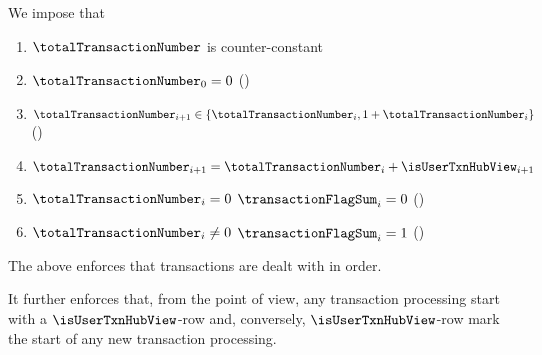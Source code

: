 We impose that
\begin{enumerate}
	\item $\totalTransactionNumber$ is counter-constant
	\item $\totalTransactionNumber _{0} = 0$ (\sanityCheck)
	\item $\totalTransactionNumber _{i + 1} \in \{ \totalTransactionNumber _{i}, 1 + \totalTransactionNumber _{i} \}$ (\sanityCheck)
	\item $\totalTransactionNumber _{i + 1} = \totalTransactionNumber _{i} + \isUserTxnHubView _{i + 1}$
	\item \If $\totalTransactionNumber _{i} =    0$ \Then $\transactionFlagSum _{i} = 0$ (\sanityCheck)
	\item \If $\totalTransactionNumber _{i} \neq 0$ \Then $\transactionFlagSum _{i} = 1$ (\sanityCheck)
\end{enumerate}
\saNote{}
The above enforces that transactions are dealt with in order.

\saNote{} \label{user txn data: generalities: total transaction number: transaction processing starts with a HUB row}
It further enforces that,
from the \txnDataMod{} point of view,
any transaction processing start with a $\isUserTxnHubView$-row
and, conversely,
$\isUserTxnHubView$-row mark the start of any new transaction processing.
